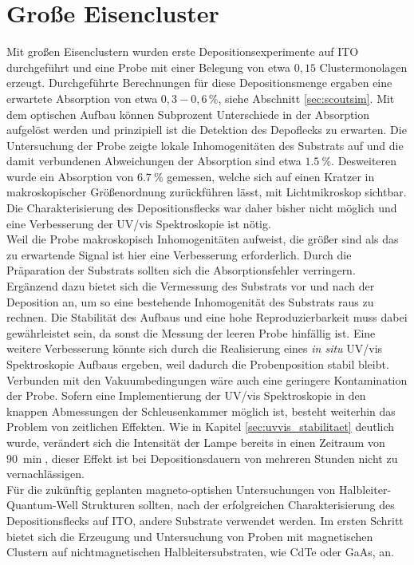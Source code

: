 \section{Große Eisencluster}
Mit großen Eisenclustern wurden erste Depositionsexperimente auf ITO durchgeführt und eine Probe mit einer Belegung von etwa $0,15$ Clustermonolagen erzeugt.
Durchgeführte Berechnungen für diese Depositionsmenge ergaben eine erwartete Absorption von etwa $0,3 - 0,6\,\%$, siehe Abschnitt \ref{sec:scoutsim}.
Mit dem optischen Aufbau können Subprozent Unterschiede in der Absorption aufgelöst werden und prinzipiell ist die Detektion des Depoflecks zu erwarten.
Die Untersuchung der Probe zeigte lokale Inhomogenitäten des Substrats auf und die damit verbundenen Abweichungen der Absorption sind etwa $\SI{1.5}{\%}$.
Desweiteren wurde ein Absorption von $\SI{6.7}{\%}$ gemessen, welche sich auf einen Kratzer in makroskopischer Größenordnung zurückführen lässt, mit Lichtmikroskop sichtbar.
Die Charakterisierung des Depositionsflecks war daher bisher nicht möglich und eine Verbesserung der UV/vis Spektroskopie ist nötig.\\

Weil die Probe makroskopisch Inhomogenitäten aufweist, die größer sind als das zu erwartende Signal ist hier eine Verbesserung erforderlich.
Durch die Präparation der Substrats sollten sich die Absorptionsfehler verringern.
Ergänzend dazu bietet sich die Vermessung des Substrats vor und nach der Deposition an, um so eine bestehende Inhomogenität des Substrats raus zu rechnen.
Die Stabilität des Aufbaus und eine hohe Reproduzierbarkeit muss dabei gewährleistet sein, da sonst die Messung der leeren Probe hinfällig ist.
Eine weitere Verbesserung könnte sich durch die Realisierung eines \textit{in situ} UV/vis Spektroskopie Aufbaus ergeben, weil dadurch die Probenposition stabil bleibt.
Verbunden mit den Vakuumbedingungen wäre auch eine geringere Kontamination der Probe.
Sofern eine Implementierung der UV/vis Spektroskopie in den knappen Abmessungen der Schleusenkammer möglich ist, besteht weiterhin das Problem von zeitlichen Effekten.
Wie in Kapitel \ref{sec:uvvis_stabilitaet} deutlich wurde, verändert sich die Intensität der Lampe bereits in einen Zeitraum von $\SI{90}{\min}$, dieser Effekt ist bei Depositionsdauern von mehreren Stunden nicht zu vernachlässigen.\\

Für die zukünftig geplanten magneto-optishen Untersuchungen von Halbleiter-Quantum-Well Strukturen sollten, nach der erfolgreichen Charakterisierung des Depositionsflecks auf ITO, andere Substrate verwendet werden.
Im ersten Schritt bietet sich die Erzeugung und Untersuchung von Proben mit magnetischen Clustern auf nichtmagnetischen Halbleitersubstraten, wie CdTe oder GaAs, an.



